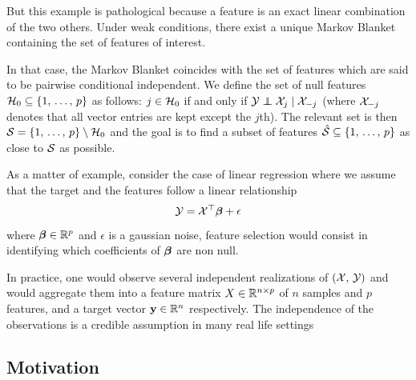 But this example is pathological because a feature is an exact linear combination of the two others.
Under weak conditions, there exist a unique Markov Blanket containing the set of features of interest.
\begin{remark}
    In that case, the Markov Blanket coincides with the set of features
    which are said to be pairwise conditional independent.
    We define the set of null features $\mathcal{H}_0 \subseteq \left\{ 1,\, \dots,\, p \right\}$ as follows:
    $j \in \mathcal{H}_0$ if and only if $\cY \independent \cX_j \mid \cX_{-j}$
    (where $\mathcal{X}_{-j}$ denotes that all vector entries are kept except the $j$th).
    The relevant set is then $\mathcal{S} = \left\{ 1,\, \dots,\, p \right\} \setminus \mathcal{H}_0$
    and the goal is to find a subset of features $\hat{\mathcal{S}} \subseteq \left\{ 1,\, \dots,\, p \right\}$ as close to $\mathcal{S}$ as possible.
\end{remark}
As a matter of example,
consider the case of linear regression where we assume that the target and the features follow a linear relationship
\begin{equation*}
    \mathcal{Y} = \mathcal{X}^\top \bm{\beta} + \epsilon
\end{equation*}
where $\bm{\beta} \in \mathbb{R}^p$ and $\epsilon$ is a gaussian noise,
feature selection would consist in identifying which coefficients of $\bm{\beta}$ are non null.

In practice, one would observe several independent realizations of
$\left( \mathcal{X},\, \mathcal{Y} \right)$ and would aggregate them into a feature matrix
$X \in \mathbb{R}^{n \times p}$ of $n$ samples and $p$ features, and a target vector $\mathbf{y} \in \mathbb{R}^n$ respectively.
The independence of the observations is a credible assumption in many real life settings

\subsection{Motivation}\label{subsec:fs_motivation}

